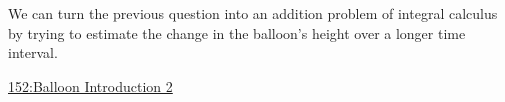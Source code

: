 \documentclass{ximera}
\begin{document}
We can turn the previous question into an addition problem of integral calculus by trying to estimate the change in the balloon's height over a longer time interval.

\begin{example} \label{ExLKDrDEfRE9}

\begin{onlineOnly}
    \begin{center}
\end{center}
\end{onlineOnly}

\href{https://www.desmos.com/calculator/h6cworakdw}{152:Balloon Introduction 2}

\end{example} 
\end{document}
